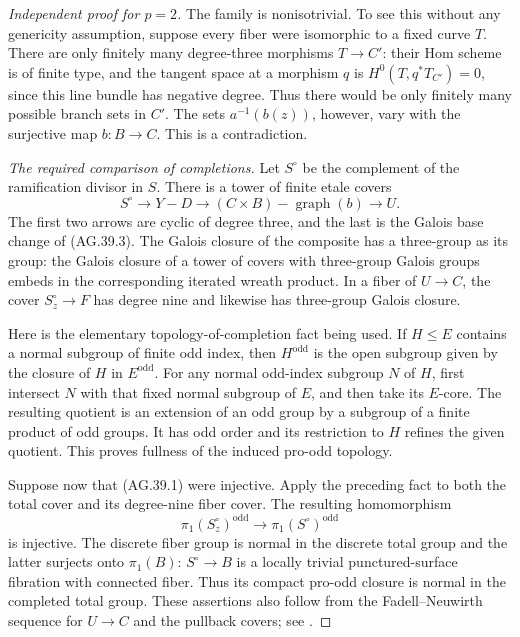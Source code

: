 \begin{proof}[Independent proof for \(p=2\)]
The family is nonisotrivial. To see this without any genericity
assumption, suppose every fiber were isomorphic to a fixed curve
\(T\). There are only finitely many degree-three morphisms
\(T\to C'\): their Hom scheme is of finite type, and the tangent
space at a morphism \(q\) is
\(H^0(T,q^*T_{C'})=0\), since this line bundle has negative
degree. Thus there would be only finitely many possible branch
sets in \(C'\). The sets \(a^{-1}(b(z))\), however, vary with
the surjective map \(b:B\to C\). This is a contradiction.

\emph{The required comparison of completions.}
Let \(S^\circ\) be the complement of the ramification divisor
in \(S\). There is a tower of finite etale covers
\[
 S^\circ\longrightarrow Y-D
 \longrightarrow (C\times B)-\operatorname{graph}(b)
 \longrightarrow U.                                 \tag{AG.39.7}
\]
The first two arrows are cyclic of degree three, and the last is
the Galois base change of (AG.39.3). The Galois closure of the
composite has a three-group as its group: the Galois closure of a
tower of covers with three-group Galois groups embeds in the
corresponding iterated wreath product. In a fiber of \(U\to C\),
the cover \(S_z^\circ\to F\) has degree nine and likewise has
three-group Galois closure.

Here is the elementary topology-of-completion fact being used.
If \(H\leq E\) contains a normal subgroup of finite odd index,
then \(H^{\mathrm{odd}}\) is the open subgroup given by the
closure of \(H\) in \(E^{\mathrm{odd}}\). For any normal
odd-index subgroup \(N\) of \(H\), first intersect \(N\)
with that fixed normal subgroup of \(E\), and then take its
\(E\)-core. The resulting quotient is an extension of an odd
group by a subgroup of a finite product of odd groups. It has
odd order and its restriction to \(H\) refines the given
quotient. This proves fullness of the induced pro-odd topology.

Suppose now that (AG.39.1) were injective. Apply the preceding
fact to both the total cover and its degree-nine fiber cover.
The resulting homomorphism
\[
 \pi_1(S_z^\circ)^{\mathrm{odd}}\longrightarrow
                 \pi_1(S^\circ)^{\mathrm{odd}}        \tag{AG.39.8}
\]
is injective. The discrete fiber group is normal in the discrete
total group and the latter surjects onto \(\pi_1(B)\):
\(S^\circ\to B\) is a locally trivial punctured-surface
fibration with connected fiber. Thus its compact pro-odd closure
is normal in the completed total group. These assertions also
follow from the Fadell--Neuwirth sequence for \(U\to C\) and
the pullback covers; see \cite[Section 2.1]{AG_Bellingeri2004}.


\end{proof}
